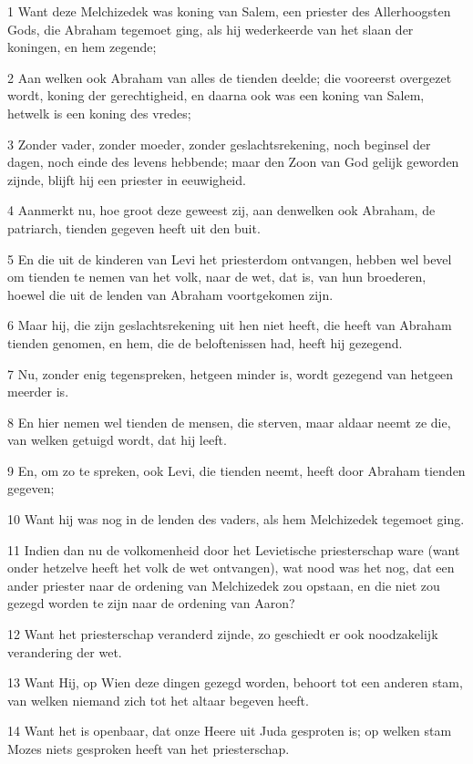 \par 1 Want deze Melchizedek was koning van Salem, een priester des Allerhoogsten Gods, die Abraham tegemoet ging, als hij wederkeerde van het slaan der koningen, en hem zegende;
\par 2 Aan welken ook Abraham van alles de tienden deelde; die vooreerst overgezet wordt, koning der gerechtigheid, en daarna ook was een koning van Salem, hetwelk is een koning des vredes;
\par 3 Zonder vader, zonder moeder, zonder geslachtsrekening, noch beginsel der dagen, noch einde des levens hebbende; maar den Zoon van God gelijk geworden zijnde, blijft hij een priester in eeuwigheid.
\par 4 Aanmerkt nu, hoe groot deze geweest zij, aan denwelken ook Abraham, de patriarch, tienden gegeven heeft uit den buit.
\par 5 En die uit de kinderen van Levi het priesterdom ontvangen, hebben wel bevel om tienden te nemen van het volk, naar de wet, dat is, van hun broederen, hoewel die uit de lenden van Abraham voortgekomen zijn.
\par 6 Maar hij, die zijn geslachtsrekening uit hen niet heeft, die heeft van Abraham tienden genomen, en hem, die de beloftenissen had, heeft hij gezegend.
\par 7 Nu, zonder enig tegenspreken, hetgeen minder is, wordt gezegend van hetgeen meerder is.
\par 8 En hier nemen wel tienden de mensen, die sterven, maar aldaar neemt ze die, van welken getuigd wordt, dat hij leeft.
\par 9 En, om zo te spreken, ook Levi, die tienden neemt, heeft door Abraham tienden gegeven;
\par 10 Want hij was nog in de lenden des vaders, als hem Melchizedek tegemoet ging.
\par 11 Indien dan nu de volkomenheid door het Levietische priesterschap ware (want onder hetzelve heeft het volk de wet ontvangen), wat nood was het nog, dat een ander priester naar de ordening van Melchizedek zou opstaan, en die niet zou gezegd worden te zijn naar de ordening van Aaron?
\par 12 Want het priesterschap veranderd zijnde, zo geschiedt er ook noodzakelijk verandering der wet.
\par 13 Want Hij, op Wien deze dingen gezegd worden, behoort tot een anderen stam, van welken niemand zich tot het altaar begeven heeft.
\par 14 Want het is openbaar, dat onze Heere uit Juda gesproten is; op welken stam Mozes niets gesproken heeft van het priesterschap.
